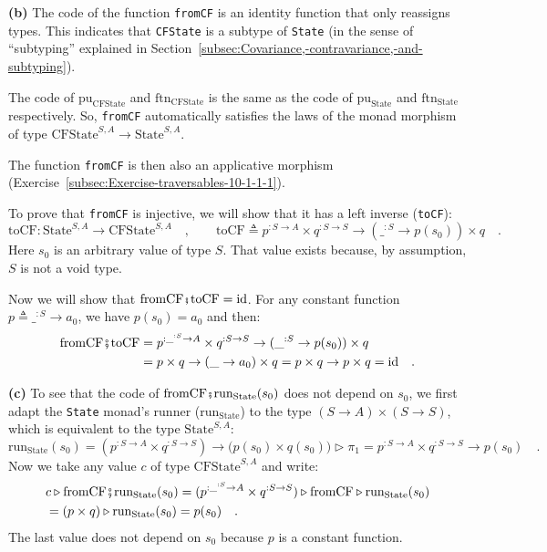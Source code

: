 \textbf{(b)} The code of the function \lstinline!fromCF! is an identity
function that only reassigns types. This indicates that \lstinline!CFState!
is a subtype of \lstinline!State! (in the sense of \textsf{``}subtyping\textsf{''}
explained in Section~\ref{subsec:Covariance,-contravariance,-and-subtyping}).

The code of $\text{pu}_{\text{CFState}}$ and $\text{ftn}_{\text{CFState}}$
is the same as the code of $\text{pu}_{\text{State}}$ and $\text{ftn}_{\text{State}}$
respectively. So, \lstinline!fromCF! automatically satisfies the
laws of the monad morphism of type $\text{CFState}^{S,A}\rightarrow\text{State}^{S,A}$. 

The function \lstinline!fromCF! is then also an applicative morphism
(Exercise~\ref{subsec:Exercise-traversables-10-1-1-1}).

To prove that \lstinline!fromCF! is injective, we will show that
it has a left inverse (\lstinline!toCF!):
\[
\text{toCF}:\text{State}^{S,A}\rightarrow\text{CFState}^{S,A}\quad,\quad\quad\text{toCF}\triangleq p^{:S\rightarrow A}\times q^{:S\rightarrow S}\rightarrow(\_^{:S}\rightarrow p(s_{0}))\times q\quad.
\]
Here $s_{0}$ is an arbitrary value of type $S$. That value exists
because, by assumption, $S$ is not a void type.

Now we will show that $\text{fromCF}\bef\text{toCF}=\text{id}$. For
any constant function $p\triangleq\_^{:S}\rightarrow a_{0}$, we have
$p(s_{0})=a_{0}$ and then:
\begin{align*}
\text{fromCF}\bef\text{toCF} & =p^{:\_^{:S}\rightarrow A}\times q^{:S\rightarrow S}\rightarrow(\_^{:S}\rightarrow p(s_{0}))\times q\\
 & =p\times q\rightarrow(\_\rightarrow a_{0})\times q=p\times q\rightarrow p\times q=\text{id}\quad.
\end{align*}

\textbf{(c)} To see that the code of $\text{fromCF}\bef\text{run}_{\text{State}}(s_{0})$
does not depend on $s_{0}$, we first adapt the \lstinline!State!
monad\textsf{'}s runner ($\text{run}_{\text{State}}$) to the type $(S\rightarrow A)\times(S\rightarrow S)$,
which is equivalent to the type $\text{State}^{S,A}$:
\[
\text{run}_{\text{State}}(s_{0})=(p^{:S\rightarrow A}\times q^{:S\rightarrow S})\rightarrow\big(p(s_{0})\times q(s_{0})\big)\triangleright\pi_{1}=p^{:S\rightarrow A}\times q^{:S\rightarrow S}\rightarrow p(s_{0})\quad.
\]
Now we take any value $c$ of type $\text{CFState}^{S,A}$ and write:
\begin{align*}
 & c\triangleright\text{fromCF}\bef\text{run}_{\text{State}}(s_{0})=(p^{:\_^{:S}\rightarrow A}\times q^{:S\rightarrow S})\triangleright\text{fromCF}\triangleright\text{run}_{\text{State}}(s_{0})\\
 & =(p\times q)\triangleright\text{run}_{\text{State}}(s_{0})=p(s_{0})\quad.
\end{align*}
The last value does not depend on $s_{0}$ because $p$ is a constant
function. 


